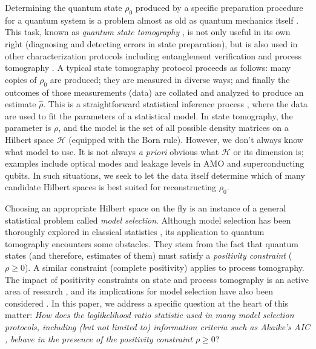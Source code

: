 \documentclass[aps,pra, twocolumn]{revtex4-1}
\newcommand{\cH}{\mathcal{H}}
\newcommand{\rhohat}{\hat{\rho}}
\begin{document}
Determining the quantum state $\rho_{0}$ produced by a specific preparation procedure for a quantum system is a problem almost as old as quantum mechanics itself \cite{Corbett2006, Pauli1933}. This task, known as \emph{quantum state tomography} \cite{Paris2004}, is not only useful in its own right (diagnosing and detecting errors in state preparation), but is also used in other characterization protocols including entanglement verification \cite{Steffen2006, Blume-Kohout2010c, VanEnk2007} and process tomography \cite{Anis2012}. A typical state tomography protocol proceeds as follows: many copies of $\rho_{0}$ are produced; they are measured in diverse ways; and finally the outcomes of those measurements (data) are collated and analyzed to produce an estimate $\rhohat$.  This is a straightforward statistical inference process \cite{Reid2015, Wasserman2004}, where the data are used to fit the parameters of a statistical model. In state tomography, the parameter is $\rho$, and the model is the set of all possible density matrices on a Hilbert space $\cH$ (equipped with the Born rule). However, we don't always know what model to use. It is not always \emph{a priori} obvious what $\cH$ or its dimension is; examples include optical modes \cite{Altepeter2005, Bertrand1987, Lvovsky2009, Breitenbach1997, Leonhardt1995} and leakage levels in AMO and superconducting \cite{Motzoi2009, Fazio1999} qubits. In such situations, we seek to let the data itself determine which of many candidate Hilbert spaces is best suited for reconstructing $\rho_{0}$.

Choosing an appropriate Hilbert space on the fly is an instance of a general statistical problem called \emph{model selection}.  Although model selection has been thoroughly explored in classical statistics \cite{Burnham2004}, its application to quantum tomography encounters some obstacles.  They stem from the fact that quantum states (and therefore, estimates of them) must satisfy a \emph{positivity constraint} ($\rho\geq0$).  A similar constraint (complete positivity) applies to process tomography.  The impact of positivity constraints on state and process tomography is an active area of research \cite{Candes2006, Flammia2012a, Suess2016, Carpentier2015}, and its implications for model selection have also been considered \cite{Schwarz2013a, Guta2012a, VanEnk2013a, Langford2013, Yin2011, Moroder2013, Knips2015}.  In this paper, we address a specific question at the heart of this matter:  \emph{How does the loglikelihood ratio statistic used in many model selection protocols, including (but not limited to) information criteria such as Akaike's AIC \cite{Akaike1974}, behave in the presence of the positivity constraint $\rho\geq0$}? 
\end{document}
